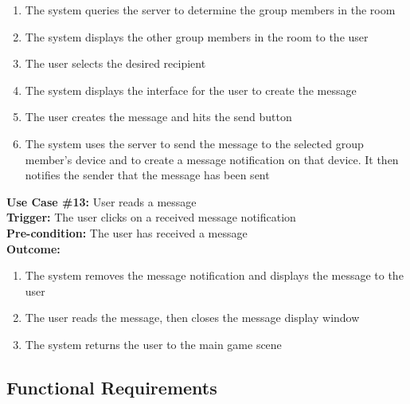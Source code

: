 \documentclass[12pt]{article}
\begin{document}
\begin{enumerate}
	\item The system queries the server to determine the group members in the room
	\item The system displays the other group members in the room to the user
	\item The user selects the desired recipient
        \item The system displays the interface for the user to create the message
        \item The user creates the message and hits the send button
        \item The system uses the server to send the message to the selected group member's device and to create a message notification on that device. It then notifies the sender that the message has been sent
\end{enumerate}
\textbf{Use Case \#13:} User reads a message\\
\textbf{Trigger:} The user clicks on a received message notification\\
\textbf{Pre-condition:} The user has received a message\\
\textbf{Outcome:}
\begin{enumerate}
        \item The system removes the message notification and displays the message to the user
	\item The user reads the message, then closes the message display window
	\item The system returns the user to the main game scene
\end{enumerate}

\subsection{Functional Requirements}
\end{document}
